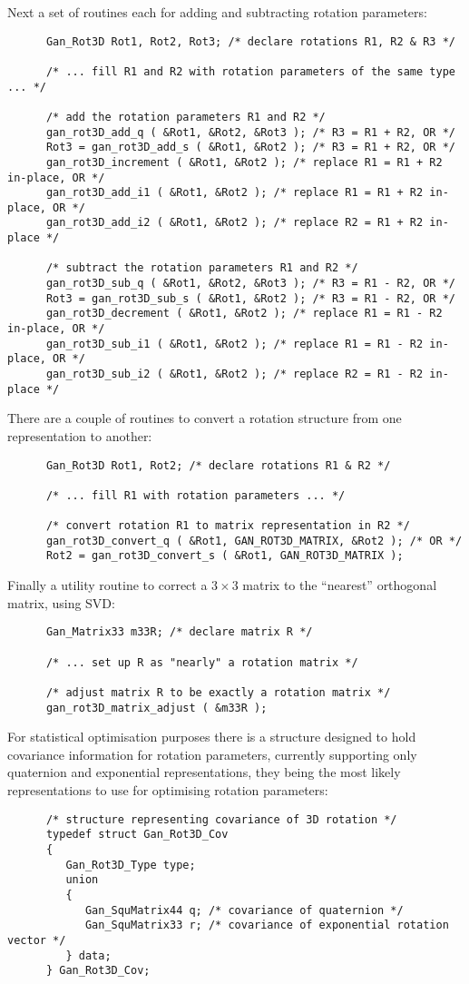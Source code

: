 Next a set of routines each for adding and subtracting rotation parameters:
\begin{verbatim}
      Gan_Rot3D Rot1, Rot2, Rot3; /* declare rotations R1, R2 & R3 */

      /* ... fill R1 and R2 with rotation parameters of the same type ... */

      /* add the rotation parameters R1 and R2 */
      gan_rot3D_add_q ( &Rot1, &Rot2, &Rot3 ); /* R3 = R1 + R2, OR */
      Rot3 = gan_rot3D_add_s ( &Rot1, &Rot2 ); /* R3 = R1 + R2, OR */
      gan_rot3D_increment ( &Rot1, &Rot2 ); /* replace R1 = R1 + R2 in-place, OR */
      gan_rot3D_add_i1 ( &Rot1, &Rot2 ); /* replace R1 = R1 + R2 in-place, OR */
      gan_rot3D_add_i2 ( &Rot1, &Rot2 ); /* replace R2 = R1 + R2 in-place */

      /* subtract the rotation parameters R1 and R2 */
      gan_rot3D_sub_q ( &Rot1, &Rot2, &Rot3 ); /* R3 = R1 - R2, OR */
      Rot3 = gan_rot3D_sub_s ( &Rot1, &Rot2 ); /* R3 = R1 - R2, OR */
      gan_rot3D_decrement ( &Rot1, &Rot2 ); /* replace R1 = R1 - R2 in-place, OR */
      gan_rot3D_sub_i1 ( &Rot1, &Rot2 ); /* replace R1 = R1 - R2 in-place, OR */
      gan_rot3D_sub_i2 ( &Rot1, &Rot2 ); /* replace R2 = R1 - R2 in-place */
\end{verbatim}

There are a couple of routines to convert a rotation structure from one
representation to another:
\begin{verbatim}
      Gan_Rot3D Rot1, Rot2; /* declare rotations R1 & R2 */

      /* ... fill R1 with rotation parameters ... */

      /* convert rotation R1 to matrix representation in R2 */
      gan_rot3D_convert_q ( &Rot1, GAN_ROT3D_MATRIX, &Rot2 ); /* OR */
      Rot2 = gan_rot3D_convert_s ( &Rot1, GAN_ROT3D_MATRIX );
\end{verbatim}

Finally a utility routine to correct a $3\times 3$ matrix to the ``nearest''
orthogonal matrix, using SVD:
\begin{verbatim}
      Gan_Matrix33 m33R; /* declare matrix R */

      /* ... set up R as "nearly" a rotation matrix */

      /* adjust matrix R to be exactly a rotation matrix */
      gan_rot3D_matrix_adjust ( &m33R );
\end{verbatim}

For statistical optimisation purposes there is a structure designed to hold
covariance information for rotation parameters, currently supporting
only quaternion and exponential representations, they being the most likely
representations to use for optimising rotation parameters:
\begin{verbatim}
      /* structure representing covariance of 3D rotation */
      typedef struct Gan_Rot3D_Cov
      {
         Gan_Rot3D_Type type;
         union
         {
            Gan_SquMatrix44 q; /* covariance of quaternion */
            Gan_SquMatrix33 r; /* covariance of exponential rotation vector */
         } data;
      } Gan_Rot3D_Cov;
\end{verbatim}

